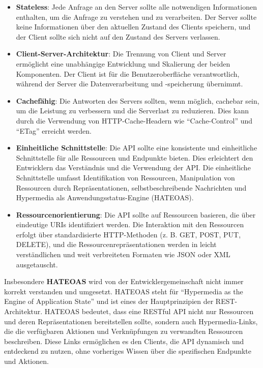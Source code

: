 \documentclass[../vs-script-first-v01.tex]{subfiles}
\begin{document}
\begin{itemize}
\item  \textbf{Stateless}: Jede Anfrage an den Server sollte alle notwendigen Informationen enthalten, um die Anfrage zu verstehen und zu verarbeiten. Der Server sollte keine Informationen über den aktuellen Zustand des Clients speichern, und der Client sollte sich nicht auf den Zustand des Servers verlassen.
\item  \textbf{Client-Server-Architektur}: Die Trennung von Client und Server ermöglicht eine unabhängige Entwicklung und Skalierung der beiden Komponenten. Der Client ist für die Benutzeroberfläche verantwortlich, während der Server die Datenverarbeitung und -speicherung übernimmt.
\item  \textbf{Cachefähig}: Die Antworten des Servers sollten, wenn möglich, cachebar sein, um die Leistung zu verbessern und die Serverlast zu reduzieren. Dies kann durch die Verwendung von HTTP-Cache-Headern wie \enquote{Cache-Control} und \enquote{ETag} erreicht werden.
\item  \textbf{Einheitliche Schnittstelle}: Die API sollte eine konsistente und einheitliche Schnittstelle für alle Ressourcen und Endpunkte bieten. Dies erleichtert den Entwicklern das Verständnis und die Verwendung der API. Die einheitliche Schnittstelle umfasst Identifikation von Ressourcen, Manipulation von Ressourcen durch Repräsentationen, selbstbeschreibende Nachrichten und Hypermedia als Anwendungsstatus-Engine (HATEOAS).
\item  \textbf{Ressourcenorientierung}: Die API sollte auf Ressourcen basieren, die über eindeutige URIs identifiziert werden. Die Interaktion mit den Ressourcen erfolgt über standardisierte HTTP-Methoden (z. B. GET, POST, PUT, DELETE), und die Ressourcenrepräsentationen werden in leicht verständlichen und weit verbreiteten Formaten wie JSON oder XML ausgetauscht.
\end{itemize}
Insbesondere \textbf{HATEOAS} wird von der Entwicklergemeinschaft nicht immer korrekt verstanden und umgesetzt. HATEOAS steht für \enquote{Hypermedia as the Engine of Application State} und ist eines der Hauptprinzipien der REST-Architektur. HATEOAS bedeutet, dass eine RESTful API nicht nur Ressourcen und deren Repräsentationen bereitstellen sollte, sondern auch Hypermedia-Links, die die verfügbaren Aktionen und Verknüpfungen zu verwandten Ressourcen beschreiben. Diese Links ermöglichen es den Clients, die API dynamisch und entdeckend zu nutzen, ohne vorheriges Wissen über die spezifischen Endpunkte und Aktionen.
\end{document}
